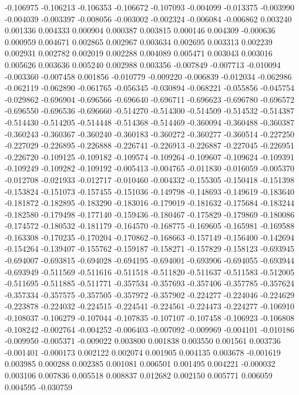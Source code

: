 -0.106975
-0.106213
-0.106353
-0.106672
-0.107093
-0.004099
-0.013375
-0.003990
-0.004039
-0.003397
-0.008056
-0.003002
-0.002324
-0.006084
-0.006862
0.003240
0.001336
0.004333
0.000904
0.000387
0.003815
0.000146
0.004309
-0.000636
0.000959
0.004671
0.002865
0.002967
0.003634
0.002695
0.003313
0.002239
0.002931
0.002782
0.002019
0.002288
0.004089
0.005471
0.003043
0.003016
0.005626
0.003636
0.005240
0.002988
0.003356
-0.007849
-0.007713
-0.010094
-0.003360
-0.007458
0.001856
-0.010779
-0.009220
-0.006839
-0.012034
-0.062986
-0.062119
-0.062890
-0.061765
-0.056345
-0.030894
-0.068221
-0.055856
-0.045754
-0.029862
-0.696904
-0.696566
-0.696640
-0.696711
-0.696623
-0.696780
-0.696572
-0.696550
-0.696536
-0.696660
-0.514270
-0.514300
-0.514509
-0.514532
-0.514387
-0.514430
-0.514205
-0.514448
-0.514368
-0.514469
-0.360094
-0.360488
-0.360387
-0.360243
-0.360367
-0.360240
-0.360183
-0.360272
-0.360277
-0.360514
-0.227250
-0.227029
-0.226895
-0.226888
-0.226741
-0.226913
-0.226887
-0.227045
-0.226951
-0.226720
-0.109125
-0.109182
-0.109574
-0.109264
-0.109607
-0.109624
-0.109391
-0.109249
-0.109282
-0.109192
-0.005413
-0.004765
-0.011830
-0.016059
-0.005370
-0.012708
-0.021933
-0.012717
-0.010460
-0.004332
-0.155305
-0.150418
-0.151398
-0.153824
-0.151073
-0.157455
-0.151036
-0.149798
-0.148693
-0.149619
-0.183640
-0.181872
-0.182895
-0.183290
-0.183016
-0.179019
-0.181632
-0.175684
-0.183244
-0.182580
-0.179498
-0.177140
-0.159436
-0.180467
-0.175829
-0.179869
-0.180086
-0.174572
-0.180532
-0.181179
-0.164570
-0.168775
-0.169605
-0.165981
-0.169588
-0.163308
-0.170235
-0.170204
-0.170862
-0.168663
-0.157149
-0.156400
-0.142694
-0.154264
-0.139407
-0.155762
-0.159187
-0.158271
-0.157829
-0.158123
-0.693945
-0.694007
-0.693815
-0.694028
-0.694195
-0.694001
-0.693906
-0.694055
-0.693944
-0.693949
-0.511569
-0.511616
-0.511518
-0.511820
-0.511637
-0.511583
-0.512005
-0.511695
-0.511885
-0.511771
-0.357534
-0.357693
-0.357406
-0.357785
-0.357624
-0.357334
-0.357575
-0.357505
-0.357972
-0.357902
-0.224277
-0.224046
-0.224629
-0.223878
-0.224032
-0.224515
-0.224541
-0.224561
-0.224473
-0.224277
-0.106910
-0.108037
-0.106279
-0.107044
-0.107835
-0.107107
-0.107458
-0.106923
-0.106808
-0.108242
-0.002764
-0.004252
-0.006403
-0.007092
-0.009969
-0.004101
-0.010186
-0.009950
-0.005371
-0.009022
0.003800
0.001838
0.003550
0.001561
0.003736
-0.001401
-0.000173
0.002122
0.002074
0.001905
0.004135
0.003678
-0.001619
0.003985
0.000288
0.002385
0.001081
0.006501
0.001495
0.004221
-0.000032
0.003106
0.007836
0.005518
0.008837
0.012682
0.002150
0.005771
0.006059
0.004595
-0.030759
